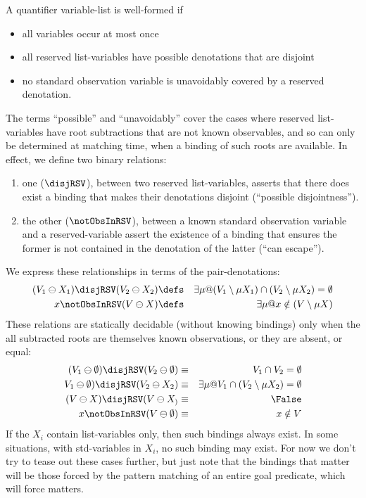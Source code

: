 A quantifier variable-list is well-formed if
\begin{itemize}
  \item all variables occur at most once
  \item all reserved list-variables have possible denotations that are disjoint
  \item no standard observation variable is unavoidably covered by a reserved
    denotation.
\end{itemize}
The terms ``possible'' and ``unavoidably'' cover the cases where reserved
list-variables have root subtractions that are not known observables,
and so can only be determined at matching time, when a binding of such
roots are available.
In effect, we define two binary relations:
\begin{enumerate}
  \item one ($\disjRSV$), between two reserved list-variables, asserts that there does exist
   a binding that makes their denotations disjoint (``possible disjointness'').
  \item the other ($\notObsInRSV$), between a known standard observation variable
  and a reserved-variable
   assert the existence of a binding that ensures the former is not contained in the denotation
   of the latter (``can escape'').
\end{enumerate}
We express these relationships in terms of the pair-denotations:
\begin{eqnarray*}
   (V_1\ominus X_1) \disjRSV (V_2\ominus X_2)
   &\defs&
   \exists \mu @ (V_1\setminus \mu X_1) \cap (V_2\setminus \mu X_2) = \emptyset
\\ x \notObsInRSV (V \ominus X)
   &\defs&
   \exists \mu @ x \notin (V \setminus \mu X)
\end{eqnarray*}
These relations are statically decidable (without knowing bindings)
only when the all subtracted roots are themselves known observations,
or they are absent, or equal:
\begin{eqnarray*}
   (V_1\ominus \emptyset) \disjRSV (V_2\ominus \emptyset)
   &\equiv&
   V_1 \cap V_2 = \emptyset
\\ V_1\ominus \emptyset) \disjRSV (V_2\ominus X_2)
   &\equiv&
   \exists \mu @ V_1 \cap (V_2\setminus \mu X_2) = \emptyset
\\ (V \ominus X) \disjRSV (V\ominus X_)
   &\equiv&
   \False
\\ x \notObsInRSV (V \ominus \emptyset)
   &\equiv&
   x \notin V
\end{eqnarray*}
If the $X_i$ contain list-variables only, then such bindings always exist.
In some situations, with std-variables in $X_i$, no such binding may exist.
For now we don't try to tease out these cases further, but just note that
the bindings that matter will be those forced by the pattern matching
of an entire goal predicate, which will force matters.

